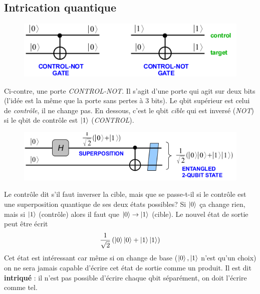 \newpage
\subsection{Intrication quantique}
	\begin{figure}
	\vspace{-5mm}
	\includegraphics[scale=0.29]{ch1/image9}
	\end{figure}
Ci-contre, une porte \textit{CONTROL-NOT}. Il s'agit d'une porte qui agit sur deux bits (l'idée
est la même que la porte sans pertes à 3 bits). Le qbit supérieur est celui de \textit{contrôle},
il ne change pas. En dessous, c'est le qbit \textit{cible} qui est inversé (\textit{NOT}) si le
qbit de contrôle est $\ket 1$ (\textit{CONTROL}).\\

	\begin{figure}
	\vspace{-5mm}
	\includegraphics[scale=0.29]{ch1/image10}
	\end{figure}
Le contrôle dit s'il faut inverser la cible, mais que se passe-t-il si le contrôle est une 
superposition quantique de ses deux états possibles? Si $\ket0$ ça change rien, mais si 
$\ket1$ (contrôle) alors il faut que $\ket0\to\ket1$ (cible). Le nouvel état de sortie peut 
être écrit
\begin{equation}
\frac{1}{\sqrt{2}}\left(\ket0\ket0+\ket1\ket1\right)
\end{equation}
Cet état est intéressant car même si on change de base ($\ket0,\ket1$ n'est qu'un choix)
on ne sera jamais capable d'écrire cet état de sortie comme un produit. Il est dit 
\textbf{intriqué} : il n'est pas possible d'écrire chaque qbit séparément, on doit l'écrire
comme tel.\\

